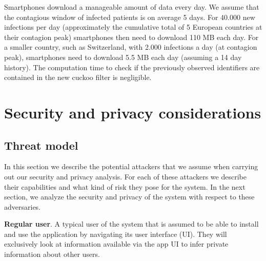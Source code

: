 \documentclass[10.8pt,a4paper]{article}
\begin{document}
Smartphones download a manageable amount of data every day. We assume that the contagious window of infected patients is on average 5 days. For 40.000 new infections per day (approximately the cumulative total of 5 European countries at their contagion peak) smartphones then need to download 110 MB each day. For a smaller country, such as Switzerland, with 2.000 infections a day (at contagion peak), smartphones need to download 5.5 MB each day (assuming a 14 day history). The computation time to check if the previously observed identifiers are contained in the new cuckoo filter is negligible.

\section{Security and privacy considerations}

\subsection{Threat model}

In this section we describe the potential attackers that we assume when carrying out our security and privacy analysis. For each of these attackers we describe their capabilities and what kind of risk they pose for the system. In the next section, we analyze the security and privacy of the system with respect to these adversaries.

\textbf{Regular user}. A typical user of the system that is assumed to be able to install and use the application by navigating its user interface (UI). They will exclusively look at information available via the app UI to infer private information about other users.
\end{document}

